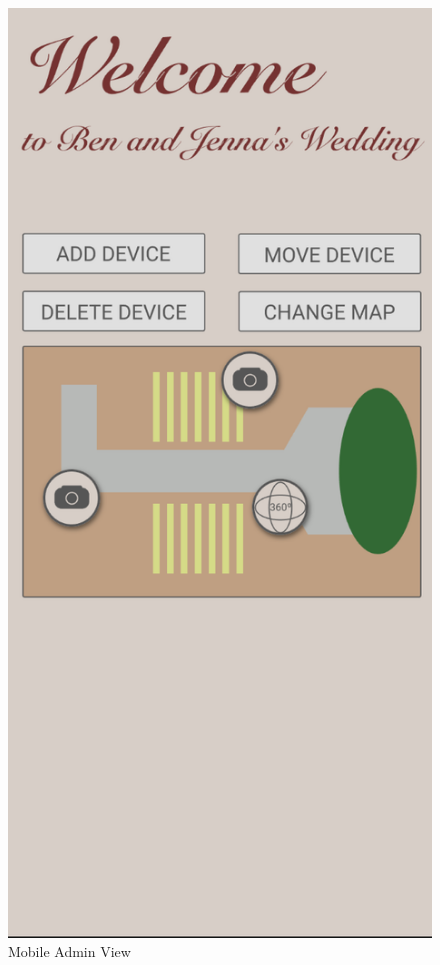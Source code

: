 \documentclass[onecolumn, draftclsnofoot,10pt, compsoc]{IEEEtran}
\begin{document}
         \begin{figure}[H]
            \includegraphics[scale=0.4]{Images/mobile-admin.png}
            \centering\caption{Mobile Admin View}

\end{figure}
\end{document}
